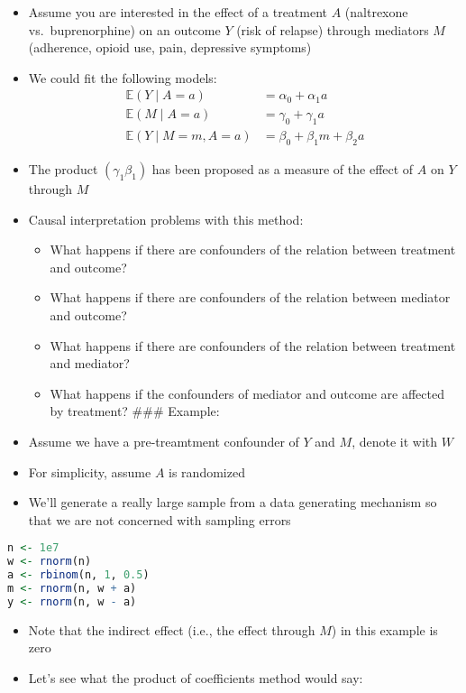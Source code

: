 \documentclass[
  12pt,
]{book}
\providecommand{\tightlist}{%
  \setlength{\itemsep}{0pt}\setlength{\parskip}{0pt}}
\theoremstyle{definition}
\theoremstyle{definition}
\theoremstyle{definition}
\newcommand{\E}{\mathbb{E}}
\newcommand{\1}{\mathbbm{1}}
\begin{document}
\begin{itemize}
\tightlist
\item
  Assume you are interested in the effect of a treatment \(A\) (naltrexone vs.~buprenorphine) on an outcome \(Y\) (risk of relapse) through mediators \(M\)
  (adherence, opioid use, pain, depressive symptoms)
\item
  We could fit the following models:
  \begin{align}
      \E(Y\mid A=a) & = \alpha_0 + \alpha_1 a\\
      \E(M\mid A=a) & = \gamma_0 + \gamma_1 a\\
      \E(Y\mid M=m, A=a) & = \beta_0 + \beta_1 m + \beta_2 a
    \end{align}
\item
  The product \((\gamma_1\beta_1)\) has been proposed as a measure of the effect
  of \(A\) on \(Y\) through \(M\)
\item
  Causal interpretation problems with this method:

  \begin{itemize}
  \tightlist
  \item
    What happens if there are confounders of the relation between treatment and outcome?
  \item
    What happens if there are confounders of the relation between mediator and outcome?
  \item
    What happens if there are confounders of the relation between treatment and mediator?
  \item
    What happens if the confounders of mediator and outcome are affected by treatment?
    \#\#\# Example:
  \end{itemize}
\item
  Assume we have a pre-treamtment confounder of \(Y\) and \(M\), denote it with \(W\)
\item
  For simplicity, assume \(A\) is randomized
\item
  We'll generate a really large sample from a data generating mechanism so that we are not concerned with sampling errors
\end{itemize}

\begin{lstlisting}[language=R]
n <- 1e7
w <- rnorm(n)
a <- rbinom(n, 1, 0.5)
m <- rnorm(n, w + a)
y <- rnorm(n, w - a)
\end{lstlisting}

\begin{itemize}
\tightlist
\item
  Note that the indirect effect (i.e., the effect through \(M\)) in this example is zero
\item
  Let's see what the product of coefficients method would say:
\end{itemize}
\end{document}
